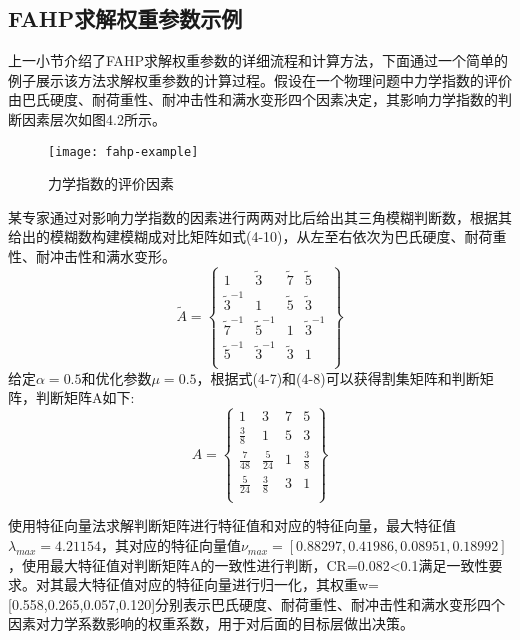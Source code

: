 \subsection{FAHP求解权重参数示例}
上一小节介绍了FAHP求解权重参数的详细流程和计算方法，下面通过一个简单的例子展示该方法求解权重参数的计算过程。假设在一个物理问题中力学指数的评价由巴氏硬度、耐荷重性、耐冲击性和满水变形四个因素决定，其影响力学指数的判断因素层次如图4.2所示。
\begin{figure}[H] %
	\centering
	\texttt{[image: fahp-example]}
	\caption{力学指数的评价因素}
\end{figure}
某专家通过对影响力学指数的因素进行两两对比后给出其三角模糊判断数，根据其给出的模糊数构建模糊成对比矩阵如式(4-10)，从左至右依次为巴氏硬度、耐荷重性、耐冲击性和满水变形。
\begin{equation}
\widetilde{A} = \left\{\begin{array}{cccc}
1 & \widetilde{3} & \widetilde{7} & \widetilde{5}  \\
\widetilde{3}^{-1} & 1 & \widetilde{5} & \widetilde{3} \\
\widetilde{7}^{-1} & \widetilde{5}^{-1} & 1 & \widetilde{3}^{-1} \\
\widetilde{5}^{-1} & \widetilde{3}^{-1} & \widetilde{3} & 1 \\
\end{array}\right\}
\end{equation}
给定$\alpha=0.5$和优化参数$\mu=0.5$，根据式(4-7)和(4-8)可以获得割集矩阵和判断矩阵，判断矩阵A如下:
\begin{equation}
A = \left\{\begin{array}{cccc}
1 & 3 & 7 & 5 \\
\frac{3}{8} & 1 & 5 & 3 \\
\frac{7}{48} & \frac{5}{24} & 1 & \frac{3}{8} \\
\frac{5}{24} & \frac{3}{8} & 3 & 1 \\
\end{array}\right\}
\end{equation}

使用特征向量法求解判断矩阵进行特征值和对应的特征向量，最大特征值$\lambda_{max}=4.21154$，其对应的特征向量值$\nu_{max}=[0.88297,0.41986,0.08951,0.18992]$，使用最大特征值对判断矩阵A的一致性进行判断，CR=0.082<0.1满足一致性要求。对其最大特征值对应的特征向量进行归一化，其权重w=[0.558,0.265,0.057,0.120]分别表示巴氏硬度、耐荷重性、耐冲击性和满水变形四个因素对力学系数影响的权重系数，用于对后面的目标层做出决策。

